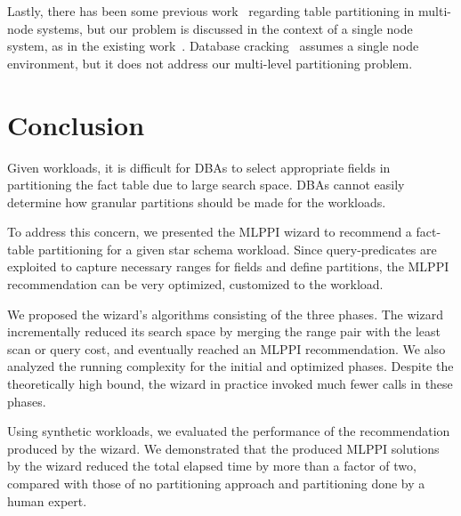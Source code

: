 \documentclass[runningheads]{comsis2}
\begin{document}
Lastly, there has been some previous work~\cite{nehme2011automated,rao2002automating,tatarowicz2012lookup} 
regarding table partitioning in multi-node \hbox{systems}, but 
our problem is discussed in the context of a single node system, as in the existing work~\cite{agrawal04:integrating}. 
Database cracking~\cite{idreoskm07}
assumes a single node environment, but 
it does not address our multi-level partitioning problem. 

\section{Conclusion}
\label{sec:conclusion}

Given workloads, it is difficult for DBAs to select appropriate fields 
in partitioning the fact table due to large search space. 
DBAs cannot easily determine how granular partitions should be made 
for the workloads. 

To address this concern, we presented the MLPPI wizard to recommend a fact-table partitioning for a given star schema workload. 
Since \hbox{query-predicates} are exploited 
to capture necessary ranges for fields and define partitions, 
the MLPPI \hbox{recommendation} can be very optimized, customized to the workload.  

We proposed the wizard's algorithms consisting of the three phases. 
The wizard incrementally reduced its search space by merging 
the range pair with the least scan or query cost, and eventually reached an MLPPI recommendation. 
We also analyzed the running complexity for the initial and optimized phases. 
Despite the theoretically high bound, the wizard in practice invoked much fewer calls in these phases.

Using synthetic workloads, we evaluated the performance of the recommendation produced by the wizard.  
We demonstrated that the produced MLPPI solutions by 
the wizard reduced the total elapsed time by more than a factor of two, 
compared with those of no partitioning approach and partitioning 
done by a human expert. 

{\footnotesize


}
\end{document}
